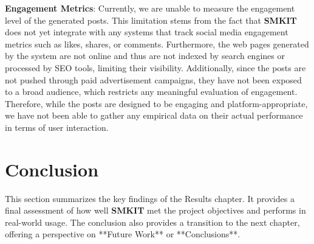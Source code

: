 \textbf{Engagement Metrics}: Currently, we are unable to measure the engagement level of the generated posts. This limitation stems from the fact that \textbf{SMKIT} does not yet integrate with any systems that track social media engagement metrics such as likes, shares, or comments. Furthermore, the web pages generated by the system are not online and thus are not indexed by search engines or processed by SEO tools, limiting their visibility. Additionally, since the posts are not pushed through paid advertisement campaigns, they have not been exposed to a broad audience, which restricts any meaningful evaluation of engagement. Therefore, while the posts are designed to be engaging and platform-appropriate, we have not been able to gather any empirical data on their actual performance in terms of user interaction.


\section{Conclusion}
\label{sec:results_conclusion}
This section summarizes the key findings of the Results chapter. It provides a final assessment of how well \textbf{SMKIT} met the project objectives and performs in real-world usage. The conclusion also provides a transition to the next chapter, offering a perspective on **Future Work** or **Conclusions**.
